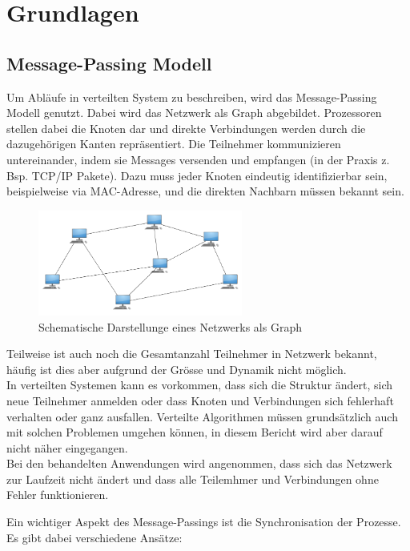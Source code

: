 \chapter{Grundlagen}
\label{chap:glundlagen}


\section{Message-Passing Modell}

Um Abläufe in verteilten System zu beschreiben, wird das Message-Passing Modell genutzt. Dabei wird das Netzwerk als Graph abgebildet. Prozessoren stellen dabei die Knoten dar und direkte Verbindungen werden durch die dazugehörigen Kanten repräsentiert. Die Teilnehmer kommunizieren untereinander, indem sie Messages versenden und empfangen (in der Praxis z. Bsp. TCP/IP Pakete). Dazu muss jeder Knoten eindeutig identifizierbar sein, beispielweise via MAC-Adresse, und die direkten Nachbarn müssen bekannt sein.

\begin{figure}[h]
	\centering
		\includegraphics[width=0.6\textwidth]{bilder/network.png}
	\caption{\label{fig:network}Schematische Darstellunge eines Netzwerks als Graph}
\end{figure}


Teilweise ist auch noch die Gesamtanzahl Teilnehmer in Netzwerk bekannt, häufig ist dies aber aufgrund der Grösse und Dynamik nicht möglich.\\
In verteilten Systemen kann es vorkommen, dass sich die Struktur ändert, sich neue Teilnehmer anmelden oder dass Knoten und Verbindungen sich fehlerhaft verhalten oder ganz ausfallen. Verteilte Algorithmen müssen grundsätzlich auch mit solchen Problemen umgehen können, in diesem Bericht wird aber darauf nicht näher eingegangen.\\
Bei den behandelten Anwendungen wird angenommen, dass sich das Netzwerk zur Laufzeit nicht ändert und dass alle Teilemhmer und Verbindungen ohne Fehler funktionieren.


Ein wichtiger Aspekt des Message-Passings ist die Synchronisation der Prozesse. Es gibt dabei verschiedene Ansätze:

